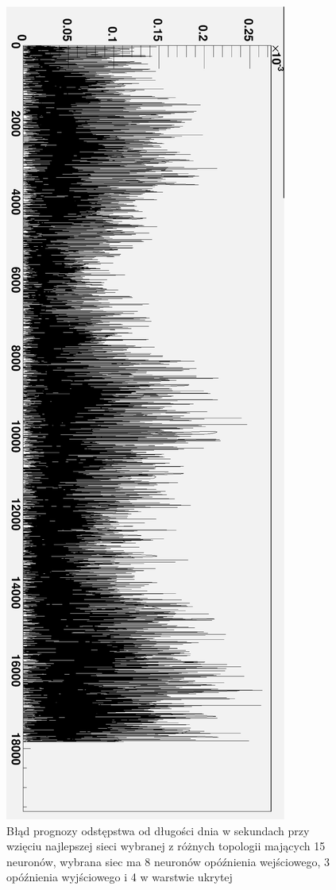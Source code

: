 \documentclass[12pt,a4]{article}
\begin{document}
\begin{figure}[htbp]
  \includegraphics[height=\textheight]{doc/img/err_s.eps}
  \caption{Błąd prognozy odstępstwa od długości dnia w sekundach przy wzięciu najlepszej sieci wybranej z różnych topologii mających 15 neuronów, wybrana siec ma 8 neuronów opóźnienia wejściowego, 3 opóźnienia wyjściowego i 4 w warstwie ukrytej}
  \label{fig:err_s}
\end{figure}
\end{document}
